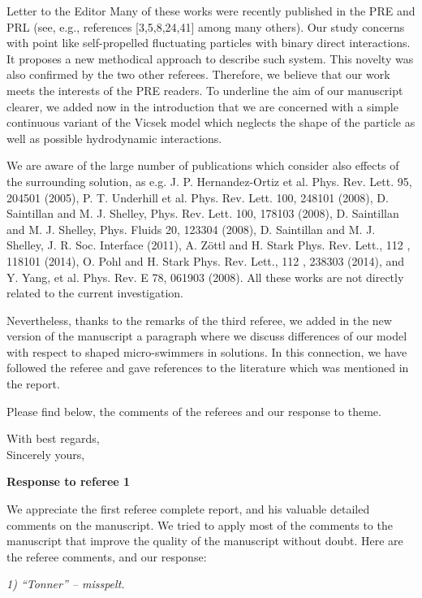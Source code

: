 \documentclass[a4paper,11pt]{letter}
\newcommand{\rf}[1]{\textit{\textcolor{hlcolor}{#1}}}
\begin{document}
\begin{letter}{Letter to the Editor}
Many of these works were recently published in the PRE and PRL (see, e.g., references [3,5,8,24,41] among many others). Our study concerns with point like self-propelled fluctuating particles with binary direct interactions. It proposes a new methodical approach to describe such system. This novelty was also confirmed by the two other referees. Therefore, we believe that our work meets the interests of the PRE readers. To underline the aim of our manuscript clearer, we added now in the introduction that we are concerned with a simple continuous variant of the Vicsek model which neglects the shape of the particle as well as possible hydrodynamic interactions.

We are aware of the large number of publications which consider also effects of the surrounding solution, as e.g. J. P. Hernandez-Ortiz et al. Phys. Rev. Lett. 95, 204501 (2005), P. T. Underhill et al. Phys. Rev. Lett. 100, 248101 (2008), D. Saintillan and M. J. Shelley, Phys. Rev. Lett. 100, 178103 (2008), D. Saintillan and M. J. Shelley, Phys. Fluids 20, 123304 (2008), D. Saintillan and M. J. Shelley, J. R. Soc. Interface (2011), A. Zöttl and H. Stark Phys. Rev. Lett., 112 , 118101 (2014), O. Pohl and H. Stark Phys. Rev. Lett., 112 , 238303 (2014), and Y. Yang, et al. Phys. Rev. E 78, 061903 (2008). All these works are not directly related to the current investigation.

Nevertheless, thanks to the remarks of the third referee, we added in the new version of the manuscript a paragraph where we discuss differences of our model with respect to shaped micro-swimmers in solutions. In this connection, we have followed the referee and gave references to the literature which was mentioned in the report.

Please find below, the comments of the referees and our response to theme.

\closing{With best regards,\\ Sincerely yours,}

\end{letter}

\pagebreak

{\Large \bf Response to referee 1}


We appreciate the first referee complete report, and his valuable detailed comments on the manuscript. We tried to apply most of the comments to the manuscript that improve the quality of the manuscript without doubt. Here are the referee comments, and our response:


\rf{1) ``Tonner'' -- misspelt.}
\end{document}
